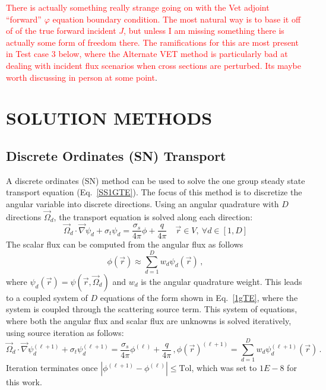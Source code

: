 \documentclass[12pt]{report}
\newcommand{\vr}{\vec{r}}
\newcommand{\vO}{\vec{\Omega}}
\newcommand{\grad}{\vec{\nabla}}
\newcommand{\sigt}{\sigma_t}
\newcommand{\sigs}{\sigma_s}
\newcommand{\angSource}{\frac{q}{4 \pi}}
\newcommand{\comment}[2]{\marginpar{\textcolor{#2}{$\star$}}\textcolor{#2}{#1}\newline}
\newcommand{\iwh}[1]{\comment{#1}{red}}
\newcommand{\iwh}[1]{\phantom{a}}
\begin{document}
\iwh{There is actually something really strange going on with the Vet adjoint ``forward''  $\varphi$ equation boundary condition. The most natural way is to base it off of of the true forward incident $J$, but unless I am missing something there is actually some form of freedom there. The ramifications for this are most present in Test case 3 below, where the Alternate VET method is particularly bad at dealing with incident flux scenarios when cross sections are perturbed. Its maybe worth discussing in person at some point}.

\chapter{\uppercase {Solution Methods}}

\section{Discrete Ordinates (SN) Transport}
A discrete ordinates (SN) method can be used to solve the one group steady state transport 
equation (Eq.~\eqref{SS1GTE}). The focus of this method is to discretize the angular variable 
into discrete directions. Using an angular quadrature with $D$ directions $\vO_d$, the transport 
equation is solved along each direction:
\begin{equation}
\label{1gSNTE}
\vO_d \cdot \grad \psi_d + \sigt \psi_d = \frac{\sigs}{4 \pi} \phi + \angSource \quad \vr \in V ,\  \forall d\in [1,D]
\end{equation}
%
The scalar flux can be computed from the angular flux as follows
\[
\phi(\vr) \approx \sum_{d=1}^D w_d \psi_d(\vr) \,,
\] 
where $\psi_d(\vr) = \psi(\vr, \vO_d)$ and $w_d$ is the angular quadrature weight. This leads to a coupled system of $D$ equations of the form shown in Eq.~\eqref{1gTE}, where the system is coupled through the scattering source term. This system of equations, where both 
the angular flux and scalar flux are unknowns is solved iteratively, using source iteration as follows:
\begin{subequations}
\begin{equation}
\label{1gTE}
\vO_d \cdot \grad \psi_d^{(\ell+1)} + \sigt \psi_d^{(\ell+1)} = \frac{\sigs}{4 \pi} \phi^{(\ell)} + \angSource \,,
\end{equation}
\begin{equation}
\phi(\vr)^{(\ell+1)} = \sum_{d=1}^D w_d \psi_d^{(\ell+1)}(\vr) \,.
\end{equation}
\end{subequations}
Iteration terminates once $\left|\phi^{(\ell+1)} - \phi^{(\ell)} \right| \leq \text{Tol}$, which was set to $1E-8$ for this work.
\end{document}
